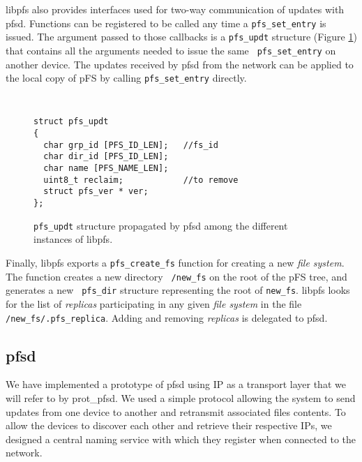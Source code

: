 libpfs also provides interfaces used for two-way communication of
updates with pfsd. Functions can be registered to be called any time a
{\tt pfs\_set\_entry} is issued. The argument passed to those
callbacks is a {\tt pfs\_updt} structure (Figure \ref{PfsUpdt}) that
contains all the arguments needed to issue the same {\tt
  pfs\_set\_entry} on another device. The updates received by pfsd
from the network can be applied to the local copy of pFS by calling
{\tt pfs\_set\_entry} directly.

\begin{figure}[ht]
\begin{center}
{\tt \small
\begin{verbatim}
struct pfs_updt
{
  char grp_id [PFS_ID_LEN];   //fs_id
  char dir_id [PFS_ID_LEN];  
  char name [PFS_NAME_LEN];
  uint8_t reclaim;            //to remove
  struct pfs_ver * ver;
};
\end{verbatim}
}
\end{center}
\caption{\label{PfsUpdt} {\small {\tt pfs\_updt} structure propagated
    by pfsd among the different instances of libpfs.}}
\end{figure}

Finally, libpfs exports a {\tt pfs\_create\_fs} function for creating
a new \emph{file system}. The function creates a new directory {\tt
  /new\_fs} on the root of the pFS tree, and generates a new {\tt
  pfs\_dir} structure representing the root of {\tt new\_fs}. libpfs
looks for the list of \emph{replicas} participating in any given
\emph{file system} in the file {\tt /new\_fs/.pfs\_replica}. Adding
and removing \emph{replicas} is delegated to pfsd.


\subsection {pfsd}

We have implemented a prototype of pfsd using IP as a transport layer
that we will refer to by prot\_pfsd. We used a simple protocol
allowing the system to send updates from one device to another and
retransmit associated files contents. To allow the devices to discover
each other and retrieve their respective IPs, we designed a central
naming service with which they register when connected to the network.

